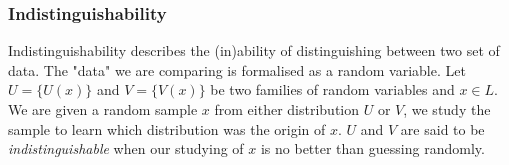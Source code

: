 \subsubsection{Indistinguishability}
Indistinguishability describes the (in)ability of distinguishing between two set of data. The "data" we are comparing is formalised as a random variable.
\bigskip
\newline
Let $U = \{U(x)\}$ and $V = \{V(x)\}$ be two families of random variables and $x \in L$.
We are given a random sample $x$ from either distribution $U$ or $V$, we study the sample to learn which distribution was the origin of $x$.
$U$ and $V$ are said to be \textit{indistinguishable} when our studying of $x$ is no better than guessing randomly.
%

%
%
%


%
%

